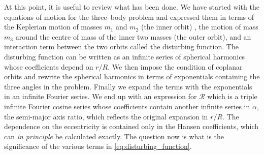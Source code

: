 At this point, it is useful to review what has been done. We have started
with the equations of motion for the three--body problem and expressed them
in terms of the Keplerian motion of masses $m_1$ and $m_2$ (the inner orbit) 
, the motion of mass $m_3$ around the centre of mass of the inner 
two masses (the outer orbit), and an interaction term between the two
orbits called the disturbing function. The disturbing function
can be written as an infinite series of spherical harmonics 
whose coefficients depend on $r/R$. We then impose the 
condition of coplanar orbits and rewrite the spherical harmonics in 
terms of exponentials containing the three angles in the problem. Finally
we expand the terms with the exponentials in an infinite Fourier series.
We end up with an expression for $\mathcal{R}$ which is a triple infinite
Fourier cosine series whose coefficients contain another infinite 
series in $\alpha$, the semi-major axis ratio, which reflects the original
expansion in $r/R$. The dependence on the eccentricity is contained
only in the Hansen coefficients, which can \emph{in principle} be
calculated exactly. The question now is what is the significance
of the various terms in \cref{eq:disturbing_function}.
